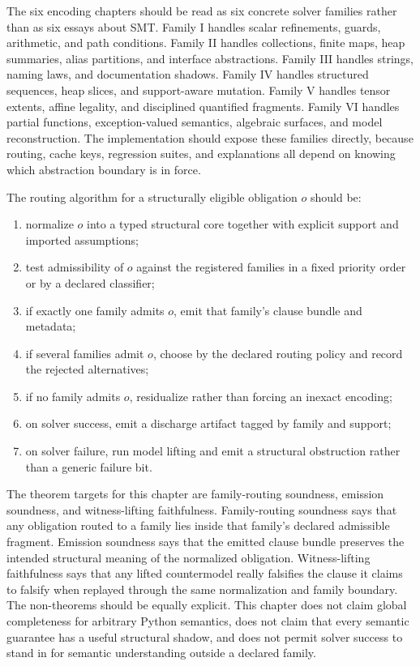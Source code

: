 \documentclass[11pt]{report}
\begin{document}
The six encoding chapters should be read as six concrete solver families rather than as six essays about SMT. Family I handles scalar refinements, guards, arithmetic, and path conditions. Family II handles collections, finite maps, heap summaries, alias partitions, and interface abstractions. Family III handles strings, naming laws, and documentation shadows. Family IV handles structured sequences, heap slices, and support-aware mutation. Family V handles tensor extents, affine legality, and disciplined quantified fragments. Family VI handles partial functions, exception-valued semantics, algebraic surfaces, and model reconstruction. The implementation should expose these families directly, because routing, cache keys, regression suites, and explanations all depend on knowing which abstraction boundary is in force.

The routing algorithm for a structurally eligible obligation $o$ should be:
\begin{enumerate}
\item normalize $o$ into a typed structural core together with explicit support and imported assumptions;
\item test admissibility of $o$ against the registered families in a fixed priority order or by a declared classifier;
\item if exactly one family admits $o$, emit that family's clause bundle and metadata;
\item if several families admit $o$, choose by the declared routing policy and record the rejected alternatives;
\item if no family admits $o$, residualize rather than forcing an inexact encoding;
\item on solver success, emit a discharge artifact tagged by family and support;
\item on solver failure, run model lifting and emit a structural obstruction rather than a generic failure bit.
\end{enumerate}

The theorem targets for this chapter are family-routing soundness, emission soundness, and witness-lifting faithfulness. Family-routing soundness says that any obligation routed to a family lies inside that family's declared admissible fragment. Emission soundness says that the emitted clause bundle preserves the intended structural meaning of the normalized obligation. Witness-lifting faithfulness says that any lifted countermodel really falsifies the clause it claims to falsify when replayed through the same normalization and family boundary. The non-theorems should be equally explicit. This chapter does not claim global completeness for arbitrary Python semantics, does not claim that every semantic guarantee has a useful structural shadow, and does not permit solver success to stand in for semantic understanding outside a declared family.
\end{document}

